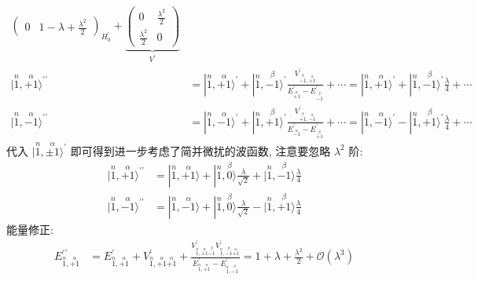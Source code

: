 \documentclass[../../main.tex]{subfiles}
\begin{document}
\begin{enumerate}
\begin{enumerate}
{{\begin{align*}
{\begin{pmatrix}
            0 & 1 - \lambda + \frac{\lambda^{2}}{2}
        \end{pmatrix}}_{H_{0}^{\prime}} + \underbrace{\begin{pmatrix}
            0 & \frac{\lambda^{2}}{2}\\
            \frac{\lambda^{2}}{2} & 0
        \end{pmatrix}}_{V^{\prime}}\\
        |\stackrel{n}{1},\stackrel{\alpha}{+1}\rangle^{\prime\prime} &= |\stackrel{n}{1},\stackrel{\alpha}{+1}\rangle^{\prime} + |\stackrel{n}{1},\stackrel{\beta}{-1}\rangle^{\prime}\frac{V^{\prime}_{\stackrel{\beta}{-1},\stackrel{\alpha}{+1}}}{E^{\prime}_{\stackrel{\alpha}{+1}} - E^{\prime}_{\stackrel{\beta}{-1}}} + \cdots
        = |\stackrel{n}{1},\stackrel{\alpha}{+1}\rangle^{\prime} + |\stackrel{n}{1},\stackrel{\beta}{-1}\rangle^{\prime}\frac{\lambda}{4} + \cdots\\
        |\stackrel{n}{1},\stackrel{\alpha}{-1}\rangle^{\prime\prime} &= |\stackrel{n}{1},\stackrel{\alpha}{-1}\rangle^{\prime} + |\stackrel{n}{1},\stackrel{\beta}{+1}\rangle^{\prime}\frac{V^{\prime}_{\stackrel{\beta}{+1},\stackrel{\alpha}{-1}}}{E^{\prime}_{\stackrel{\alpha}{-1}} - E^{\prime}_{\stackrel{\beta}{+1}}} + \cdots
        = |\stackrel{n}{1},\stackrel{\alpha}{-1}\rangle^{\prime} - |\stackrel{n}{1},\stackrel{\beta}{+1}\rangle^{\prime}\frac{\lambda}{4} + \cdots
    \end{align*}
    代入 $|\stackrel{n}{1},\stackrel{\alpha}{\pm 1}\rangle^{\prime}$ 即可得到进一步考虑了简并微扰的波函数, 注意要忽略 $\lambda^{2}$ 阶:
    \begin{align*}
        |\stackrel{n}{1},\stackrel{\alpha}{+1}\rangle^{\prime\prime} &= |\stackrel{n}{1},\stackrel{\alpha}{+1}\rangle + |\stackrel{n}{1},\stackrel{\beta}{0}\rangle\frac{\lambda}{\sqrt{2}} + |\stackrel{n}{1},\stackrel{\beta}{-1}\rangle\frac{\lambda}{4}\\
        |\stackrel{n}{1},\stackrel{\alpha}{-1}\rangle^{\prime\prime} &= |\stackrel{n}{1},\stackrel{\alpha}{-1}\rangle + |\stackrel{n}{1},\stackrel{\beta}{0}\rangle\frac{\lambda}{\sqrt{2}} - |\stackrel{n}{1},\stackrel{\beta}{+1}\rangle\frac{\lambda}{4}
    \end{align*}
    能量修正:
    \begin{align*}
        E^{\prime\prime}_{\stackrel{n}{1},\stackrel{\alpha}{+1}} &= E^{\prime}_{\stackrel{n}{1},\stackrel{\alpha}{+1}} + V^{\prime}_{\stackrel{n}{1},\stackrel{\alpha}{+1}\stackrel{\alpha}{+1}} + \frac{V^{\prime}_{\stackrel{n}{1},\stackrel{\alpha}{+1}\stackrel{\beta}{-1}}V^{\prime}_{\stackrel{n}{1},\stackrel{\beta}{-1}\stackrel{\alpha}{+1}}}{E^{\prime}_{\stackrel{n}{1},\stackrel{\alpha}{+1}} - E^{\prime}_{\stackrel{n}{1},\stackrel{\beta}{-1}}} = 1 + \lambda + \frac{\lambda^{2}}{2} + \mathcal{O}(\lambda^{3})\\

\end{align*}}}
\end{enumerate}
\end{enumerate}
\end{document}
